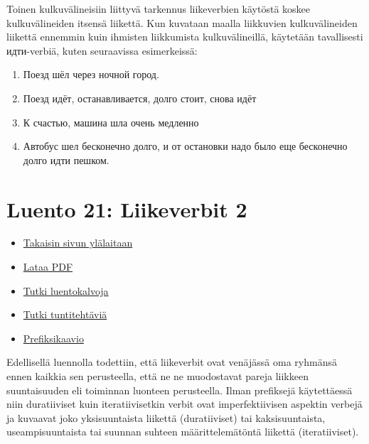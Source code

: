 \documentclass[]{scrartcl}
\providecommand{\tightlist}{%
  \setlength{\itemsep}{0pt}\setlength{\parskip}{0pt}}
\begin{document}
Toinen kulkuvälineisiin liittyvä tarkennus liikeverbien käytöstä koskee
kulkuvälineiden itsensä liikettä. Kun kuvataan maalla liikkuvien
kulkuvälineiden liikettä ennemmin kuin ihmisten liikkumista
kulkuvälineillä, käytetään tavallisesti идти-verbiä, kuten seuraavissa
esimerkeissä:

\begin{enumerate}
\def\labelenumi{(\arabic{enumi})}
\setcounter{enumi}{405}
\tightlist
\item
  Поезд шёл через ночной город.
\item
  Поезд идёт, останавливается, долго стоит, снова идёт
\item
  К счастью, машина шла очень медленно
\item
  Автобус шел бесконечно долго, и от остановки надо было еще бесконечно
  долго идти пешком.
\end{enumerate}

\section{Luento 21: Liikeverbit 2}\label{luento-21-liikeverbit-2}

\begin{itemize}
\tightlist
\item
  \href{https://mustikka.uta.fi/~juho_harme/morfologia/\#tästä-kurssista}{Takaisin
  sivun ylälaitaan}
\item
  \href{http://mustikka.uta.fi/~juho_harme/morfologia/materiaalit/luento21.pdf}{Lataa
  PDF}
\item
  \href{http://mustikka.uta.fi/~juho_harme/morfologia/presentations/luento21.html}{Tutki
  luentokalvoja}
\item
  \href{http://mustikka.uta.fi/~juho_harme/morfologia/tehtavat/luento21.pdf}{Tutki
  tuntitehtäviä}
\item
  \href{http://people.uta.fi/~harme.juho.k/aspekti-ja-liikeverbiteoria/aihekokonaisuudet/tehtavat/prefiksikaavio.pdf}{Prefiksikaavio}
\end{itemize}

Edellisellä luennolla todettiin, että liikeverbit ovat venäjässä oma
ryhmänsä ennen kaikkia sen perusteella, että ne ne muodostavat pareja
liikkeen suuntaisuuden eli toiminnan luonteen perusteella. Ilman
prefiksejä käytettäessä niin duratiiviset kuin iteratiivisetkin verbit
ovat imperfektiivisen aspektin verbejä ja kuvaavat joko yksisuuntaista
liikettä (duratiiviset) tai kaksisuuntaista, useampisuuntaista tai
suunnan suhteen määrittelemätöntä liikettä (iteratiiviset).
\end{document}
